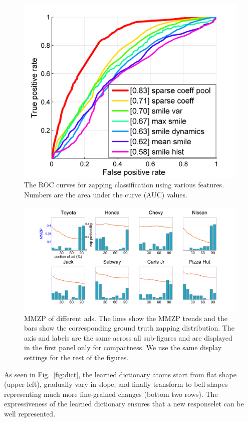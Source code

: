 \documentclass[twoside,leqno,twocolumn]{article}
\begin{document}
\begin{figure}[h]
	\centering
		\includegraphics[width=.85\columnwidth]{fig/cls_performance.png}
	\caption{The ROC curves for zapping classification using various features. Numbers are the area under the curve (AUC) values.}
	\label{fig:cls_performance}
\end{figure}


\begin{figure}[t]
	\centering
		\includegraphics[width=.8\textwidth]{fig/ad.png}
	\caption{MMZP of different ads. The lines show the MMZP trends and the bars show the corresponding ground truth zapping distribution. The axis and labels are the same across all sub-figures and are displayed in the first panel only for compactness. We use the same display settings for the rest of the figures.}
	\label{fig:ad}
\end{figure}

As seen in Fig.~\ref{fig:dict}, the learned dictionary atoms start from flat shape (upper left), gradually vary in slope, and finally transform to bell shapes representing much more fine-grained changes (bottom two rows). The expressiveness of the learned dictionary ensures that a new responselet can be well represented. 
\end{document}
